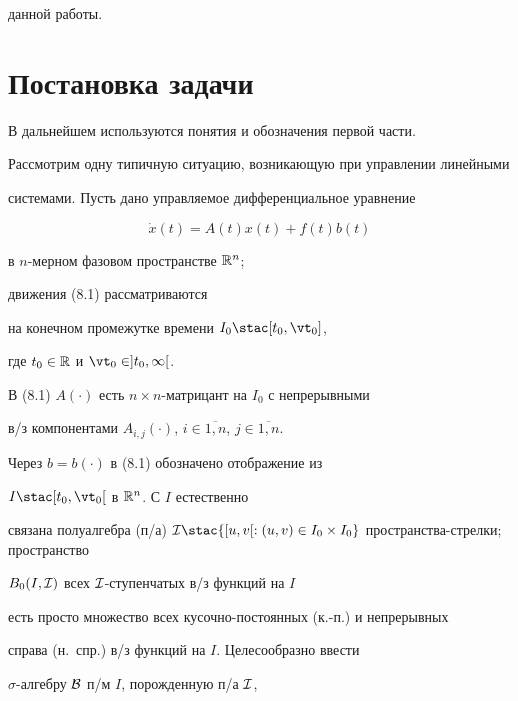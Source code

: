 данной работы.





\section{Постановка задачи}





В дальнейшем используются понятия и обозначения первой части.





Рассмотрим одну типичную ситуацию, возникающую при управлении линейными


системами. Пусть дано управляемое дифференциальное уравнение


\begin{equation}


\Dot x (t) = {A(t)}{x(t)} + {f(t)}{b(t)}


\end{equation}


в $n$-мерном фазовом пространстве ${\Bbb R}^n$;


движения (8.1) рассматриваются


на конечном промежутке времени ${I_0} \stac [{t_0},{{\vt}_0}]$,


где ${t_0} \in {\Bbb R}$ и ${{\vt}_0} \in ]{t_0},\infty[$.


В (8.1) $A(\cdot)$ есть $n \times n$-матрицант на $I_0$ с непрерывными


в/з компонентами ${A_{i,j}}(\cdot)$, $i \in \overline{1,n}$, $j \in


\overline{1,n}$.


Через $b = b(\cdot)$ в (8.1) обозначено отображение из


$I \stac [{t_0},{{\vt}_0}[$ в ${{\Bbb R}^n}$. С $I$ естественно


связана полуалгебра (п/а) ${\cal I} \stac \{[u,v[:


(u,v) \in {I_0} \times {I_0}\}$ пространства-стрелки; пространство


${B_0}(I,{\cal I})$ всех ${\cal I}$-ступенчатых в/з функций на $I$


есть просто множество всех кусочно-постоянных (к.-п.) и непрерывных


справа (н.~спр.) в/з функций на $I$. Целесообразно ввести


$\sigma$-алгебру ${\cal B}$ п/м $I$, порожденную п/а ${\cal I}$,


